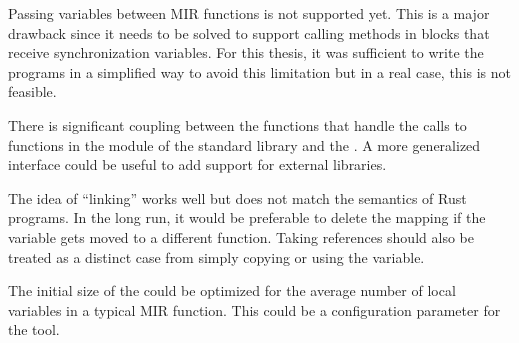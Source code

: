 Passing variables between \acrshort{MIR} functions is not supported yet.
This is a major drawback since it needs to be solved to support calling methods
in  blocks that receive synchronization variables.
For this thesis, it was sufficient to write the programs in a simplified way to
avoid this limitation but in a real case, this is not feasible.

There is significant coupling between the functions that handle the calls to
functions in the  module of the standard library and the .
A more generalized interface could be useful to add support for external libraries.

The idea of ``linking'' works well but does not match the semantics of Rust programs.
In the long run, it would be preferable to delete the mapping
if the variable gets moved to a different function.
Taking references should also be treated as a distinct case
from simply copying or using the variable.

The initial size of the  could be optimized
for the average number of local variables in a typical \acrshort{MIR} function.
This could be a configuration parameter for the tool.